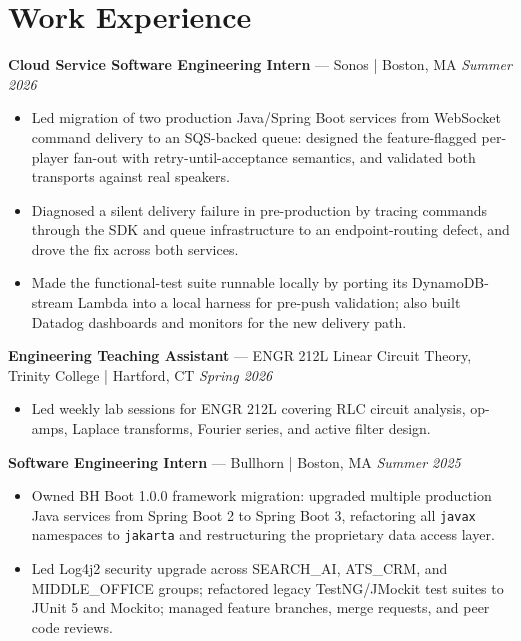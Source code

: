 \documentclass[10pt, letterpaper]{article}
\begin{document}
\section{Work Experience}

\noindent
\textbf{Cloud Service Software Engineering Intern} --- Sonos | Boston, MA
\hfill \textit{Summer 2026}
\begin{itemize}
  \item Led migration of two production Java/Spring Boot services from WebSocket command
    delivery to an SQS-backed queue: designed the feature-flagged per-player fan-out with
    retry-until-acceptance semantics, and validated both transports against real speakers.
  \item Diagnosed a silent delivery failure in pre-production by tracing commands through
    the SDK and queue infrastructure to an endpoint-routing defect, and drove the fix
    across both services.
  \item Made the functional-test suite runnable locally by porting its DynamoDB-stream
    Lambda into a local harness for pre-push validation; also built Datadog dashboards
    and monitors for the new delivery path.
\end{itemize}

\vspace{1pt}\noindent
\textbf{Engineering Teaching Assistant} --- ENGR 212L Linear Circuit Theory, Trinity College | Hartford, CT
\hfill \textit{Spring 2026}
\begin{itemize}
  \item Led weekly lab sessions for ENGR 212L covering RLC circuit analysis, op-amps,
    Laplace transforms, Fourier series, and active filter design.
\end{itemize}

\vspace{1pt}\noindent
\textbf{Software Engineering Intern} --- Bullhorn | Boston, MA
\hfill \textit{Summer 2025}
\begin{itemize}
  \item Owned BH Boot 1.0.0 framework migration: upgraded multiple production Java services
    from Spring Boot 2 to Spring Boot 3, refactoring all \texttt{javax} namespaces to
    \texttt{jakarta} and restructuring the proprietary data access layer.
  \item Led Log4j2 security upgrade across SEARCH\_AI, ATS\_CRM, and MIDDLE\_OFFICE groups;
    refactored legacy TestNG/JMockit test suites to JUnit 5 and Mockito; managed
    feature branches, merge requests, and peer code reviews.
\end{itemize}
\end{document}
